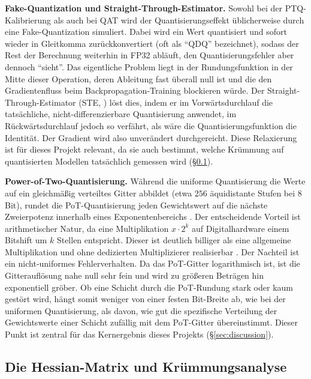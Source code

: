 \textbf{Fake-Quantization und Straight-Through-Estimator.} Sowohl bei der PTQ-Kalibrierung als auch bei QAT wird der Quantisierungseffekt üblicherweise durch eine Fake-Quantization simuliert. Dabei wird ein Wert quantisiert und sofort wieder in Gleitkomma zurückkonvertiert (oft als \enquote{QDQ} bezeichnet), sodass der Rest der Berechnung weiterhin in FP32 abläuft, den Quantisierungsfehler aber dennoch \enquote{sieht}. Das eigentliche Problem liegt in der Rundungsfunktion in der Mitte dieser Operation, deren Ableitung fast überall null ist und die den Gradientenfluss beim Backpropagation-Training blockieren würde. Der Straight-Through-Estimator (STE, \cite{bengio_ste_2013}) löst dies, indem er im Vorwärtsdurchlauf die tatsächliche, nicht-differenzierbare Quantisierung anwendet, im Rückwärtsdurchlauf jedoch so verfährt, als wäre die Quantisierungsfunktion die Identität. Der Gradient wird also unverändert durchgereicht. Diese Relaxierung ist für dieses Projekt relevant, da sie auch bestimmt, welche Krümmung auf quantisierten Modellen tatsächlich gemessen wird (\S\ref{sec:fund-hessian}).
\par\medskip

\textbf{Power-of-Two-Quantisierung.} Während die uniforme Quantisierung die Werte auf ein gleichmäßig verteiltes Gitter abbildet (etwa $256$ äquidistante Stufen bei 8 Bit), rundet die PoT-Quantisierung jeden Gewichtswert auf die nächste Zweierpotenz innerhalb eines Exponentenbereichs \citep{miyashita_pot_2016}. Der entscheidende Vorteil ist arithmetischer Natur, da eine Multiplikation $x \cdot 2^k$ auf Digitalhardware einem Bitshift um $k$ Stellen entspricht. Dieser ist deutlich billiger als eine allgemeine Multiplikation und ohne dedizierten Multiplizierer realisierbar \citep{przewlocka_rus_pot_2022}. Der Nachteil ist ein nicht-uniformes Fehlerverhalten. Da das PoT-Gitter logarithmisch ist, ist die Gitterauflösung nahe null sehr fein und wird zu größeren Beträgen hin exponentiell gröber. Ob eine Schicht durch die PoT-Rundung stark oder kaum gestört wird, hängt somit weniger von einer festen Bit-Breite ab, wie bei der uniformen Quantisierung, als davon, wie gut die spezifische Verteilung der Gewichtswerte einer Schicht zufällig mit dem PoT-Gitter übereinstimmt. Dieser Punkt ist zentral für das Kernergebnis dieses Projekts (\S\ref{sec:discussion}).

\subsection{Die Hessian-Matrix und Krümmungsanalyse}
\label{sec:fund-hessian}

